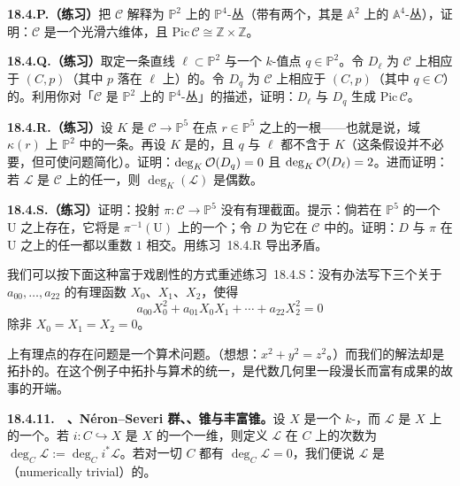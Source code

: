 \textbf{18.4.P.（练习）}\quad 把 $\mathscr{C}$ 解释为 $\mathbb{P}^2$ 上的 $\mathbb{P}^4$-丛（带有两个\trIrreducible\trDivisor，其\trComplement{}是 $\mathbb{A}^2$ 上的 $\mathbb{A}^4$-丛），证明：$\mathscr{C}$ 是一个光滑六维体，且 $\mathrm{Pic}\,\mathscr{C}\cong\mathbb{Z}\times\mathbb{Z}$。

\textbf{18.4.Q.（练习）}\quad 取定一条直线 $\ell\subset\mathbb{P}^2$ 与一个 $k$-值点 $q\in\mathbb{P}^2$。令 $D_\ell$ 为 $\mathscr{C}$ 上相应于 $(C,p)$（其中 $p$ 落在 $\ell$ 上）的\trDivisor。令 $D_q$ 为 $\mathscr{C}$ 上相应于 $(C,p)$（其中 $q\in C$）的\trDivisor。利用你对「$\mathscr{C}$ 是 $\mathbb{P}^2$ 上的 $\mathbb{P}^4$-丛」的描述，证明：$D_\ell$ 与 $D_q$ 生成 $\mathrm{Pic}\,\mathscr{C}$。

\textbf{18.4.R.（练习）}\quad 设 $K$ 是 $\mathscr{C}\to\mathbb{P}^5$ 在点 $r\in\mathbb{P}^5$ 之上的一根\trFiber——也就是说，域 $\kappa(r)$ 上 $\mathbb{P}^2$ 中的一条\trConic。再设 $K$ 是\trIntegral{}的，且 $q$ 与 $\ell$ 都不含于 $K$（这条假设并不必要，但可使问题简化）。证明：$\deg_K\mathcal{O}(D_q)=0$ 且 $\deg_K\mathcal{O}(D_\ell)=2$。进而证明：若 $\mathscr{L}$ 是 $\mathscr{C}$ 上的任一\trInvertibleSheaf，则 $\deg_K(\mathscr{L})$ 是偶数。

\textbf{18.4.S.（练习）}\quad 证明：投射 $\pi\colon\mathscr{C}\to\mathbb{P}^5$ 没有有理截面。提示：倘若在 $\mathbb{P}^5$ 的一个\trOpenSubset{} $\mathrm{U}$ 之上存在\trRegular{}\trSection，它将是 $\pi^{-1}(\mathrm{U})$ 上的一个\trDivisor；令 $D$ 为它在 $\mathscr{C}$ 中的\trClosure。证明：$D$ 与 $\pi$ 在 $\mathrm{U}$ 之上的任一\trFiber{}都以重数 $1$ 相交。用\mbox{练习~18.4.R} 导出矛盾。

我们可以按下面这种富于戏剧性的方式重述\mbox{练习~18.4.S}：没有办法写下三个关于 $a_{00},\dots,a_{22}$ 的有理函数 $X_0$、$X_1$、$X_2$，使得
\[
a_{00}X_0^2+a_{01}X_0X_1+\cdots+a_{22}X_2^2=0
\]
除非 $X_0=X_1=X_2=0$。

\trConic{}上有理点的存在问题是一个算术问题。（想想：$x^2+y^2=z^2$。）而我们的解法却是拓扑的。在这个例子中拓扑与算术的统一，是代数几何里一段漫长而富有成果的故事的开端。

\textbf{18.4.11.}\ \hard\ \textbf{\trNumericallyEquivalent、N\'eron--Severi 群、\trNef\trLineBundle、\trNef{}锥与丰富锥。}\quad 设 $X$ 是一个\trProper{} $k$-\trVariety，而 $\mathscr{L}$ 是 $X$ 上的一个\trInvertibleSheaf。若 $i\colon C\hookrightarrow X$ 是 $X$ 的一个一维\trClosed\trReduced{}\trSubscheme，则定义 $\mathscr{L}$ 在 $C$ 上的次数为 $\deg_C\mathscr{L}:=\deg_C i^*\mathscr{L}$。若对一切 $C$ 都有 $\deg_C\mathscr{L}=0$，我们便说 $\mathscr{L}$ 是\textbf{\trNumericallyTrivial}（numerically trivial）的。

